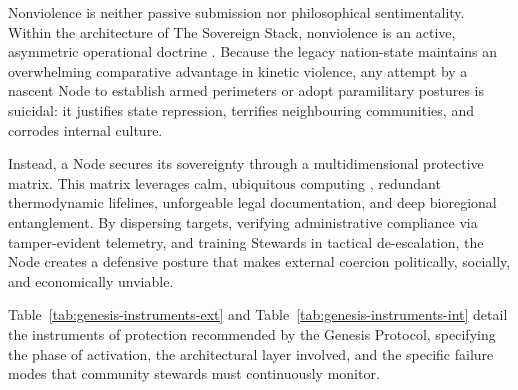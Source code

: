 Nonviolence is neither passive submission nor philosophical sentimentality. Within the architecture of The Sovereign Stack, nonviolence is an active, asymmetric operational doctrine \parencite{sharp1973, chenoweth2011}. Because the legacy nation-state maintains an overwhelming comparative advantage in kinetic violence, any attempt by a nascent Node to establish armed perimeters or adopt paramilitary postures is suicidal: it justifies state repression, terrifies neighbouring communities, and corrodes internal culture.

Instead, a Node secures its sovereignty through a multidimensional protective matrix. This matrix leverages calm, ubiquitous computing \parencite{weiser1996calm}, redundant thermodynamic lifelines, unforgeable legal documentation, and deep bioregional entanglement. By dispersing targets, verifying administrative compliance via tamper-evident telemetry, and training Stewards in tactical de-escalation, the Node creates a defensive posture that makes external coercion politically, socially, and economically unviable.

Table~\ref{tab:genesis-instruments-ext} and Table~\ref{tab:genesis-instruments-int} detail the instruments of protection recommended by the Genesis Protocol, specifying the phase of activation, the architectural layer involved, and the specific failure modes that community stewards must continuously monitor.

